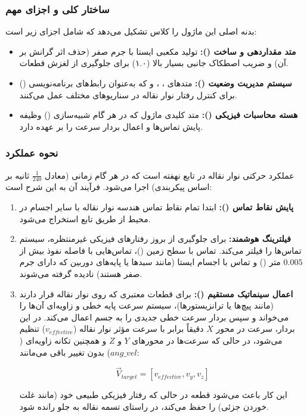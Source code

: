 \documentclass{article}
\begin{document}
\subsubsection{ساختار کلی و اجزای مهم}
بدنه اصلی این ماژول را کلاس  تشکیل می‌دهد که شامل اجزای زیر است:

\begin{itemize}
	\item \textbf{متد مقداردهی و ساخت ():} تولید مکعبی ایستا با جرم صفر (حذف اثر گرانش بر آن) و ضریب اصطکاک جانبی بسیار بالا (۱.۰) برای جلوگیری از لغزش قطعات.
	\item \textbf{سیستم مدیریت وضعیت ():} متدهای ، ،  و  که به‌عنوان رابط‌های برنامه‌نویسی () برای کنترل رفتار نوار نقاله در سناریوهای مختلف عمل می‌کنند.
	\item \textbf{هسته محاسبات فیزیکی ():} متد کلیدی ماژول که در هر گام شبیه‌سازی () وظیفه پایش تماس‌ها و اعمال بردار سرعت را بر عهده دارد.
\end{itemize}

\subsubsection{نحوه عملکرد}
عملکرد حرکتی نوار نقاله در تابع  نهفته است که در هر گام زمانی (معادل $\frac{1}{240}$ ثانیه بر اساس پیکربندی) اجرا می‌شود. فرآیند آن به این شرح است:

\begin{enumerate}
	\item \textbf{پایش نقاط تماس ():} ابتدا تمام نقاط تماس هندسه نوار نقاله با سایر اجسام در محیط از طریق تابع  استخراج می‌شود.
	\item \textbf{فیلترینگ هوشمند:} برای جلوگیری از بروز رفتارهای فیزیکی غیرمنتظره، سیستم تماس‌ها را فیلتر می‌کند. تماس با سطح زمین ()، تماس‌هایی با فاصله نفوذ بیش از $0.005$ متر () و تماس با اجسام ایستا (مانند سبدها یا پایه‌های دوربین که دارای جرم صفر هستند) نادیده گرفته می‌شوند.
	\item \textbf{اعمال سینماتیک مستقیم ():} برای قطعات معتبری که روی نوار نقاله قرار دارند (مانند پیچ‌ها یا ترانزیستورها)، سیستم سرعت پایه خطی و زاویه‌ای آن‌ها را می‌خواند و سپس بردار سرعت خطی جدیدی را به جسم اعمال می‌کند. در این بردار، سرعت در محور $X$ دقیقاً برابر با سرعت مؤثر نوار نقاله ($v_{effective}$) تنظیم می‌شود، در حالی که سرعت‌ها در محورهای $Y$ و $Z$ و همچنین تکانه زاویه‌ای ($ang\_vel$) بدون تغییر باقی می‌مانند:
	
	$$\vec{V}_{target} = [v_{effective}, v_y, v_z]$$
	
	این کار باعث می‌شود قطعه در حالی که رفتار فیزیکی طبیعی خود (مانند غلت خوردن جزئی) را حفظ می‌کند، در راستای تسمه نقاله به جلو رانده شود.
\end{enumerate}
\end{document}
